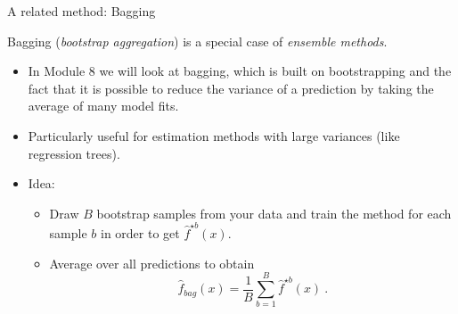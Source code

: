 \documentclass[10pt,ignorenonframetext,]{beamer}
\providecommand{\tightlist}{%
  \setlength{\itemsep}{0pt}\setlength{\parskip}{0pt}}
\begin{document}
\begin{frame}

\begin{block}{A related method: Bagging}

\vspace{2mm}

Bagging (\emph{bootstrap aggregation}) is a special case of
\emph{ensemble methods}.

\vspace{2mm}

\begin{itemize}
\tightlist
\item
  In Module 8 we will look at bagging, which is built on bootstrapping
  and the fact that it is possible to reduce the variance of a
  prediction by taking the average of many model fits.
\end{itemize}

\vspace{2mm}

\begin{itemize}
\tightlist
\item
  Particularly useful for estimation methods with large variances (like
  regression trees).
\end{itemize}

\vspace{2mm}

\begin{itemize}
\tightlist
\item
  Idea:

  \begin{itemize}
  \tightlist
  \item
    Draw \(B\) bootstrap samples from your data and train the method for
    each sample \(b\) in order to get \(\hat{f}^{\star b}(x)\).
  \item
    Average over all predictions to obtain
    \[\hat{f}_{bag}(x) = \frac{1}{B} \sum_{b=1}^B \hat{f}^{\star b}(x) \ .\]
  \end{itemize}
\end{itemize}

\end{block}

\end{frame}
\end{document}
